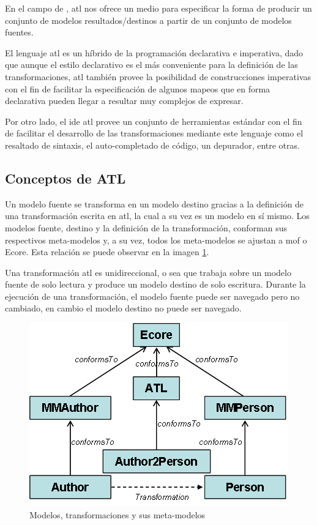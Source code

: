 \documentclass[a4paper,12pt,oneside,spanish]{book}
\begin{document}
En el campo de , \gls{atl} nos ofrece un medio para especificar la forma de producir un conjunto de modelos resultados/destinos a partir de un conjunto de modelos fuentes.

El lenguaje \gls{atl} es un híbrido de la programación declarativa e imperativa, dado que aunque el estilo declarativo es el más conveniente para la definición de las transformaciones, \gls{atl} también provee la posibilidad de construcciones imperativas con el fin de facilitar la especificación de algunos mapeos que en forma declarativa pueden llegar a resultar muy complejos de expresar.

Por otro lado, el \gls{ide} \gls{atl} provee un conjunto de herramientas estándar con el fin de facilitar el desarrollo de las transformaciones mediante este lenguaje como el  resaltado de sintaxis, el auto-completado de código, un depurador, entre otras.



\subsection{Conceptos de ATL}

Un modelo fuente se transforma en un modelo destino gracias a la definición de una transformación escrita en \gls{atl}, la cual a su vez es un modelo en sí mismo. Los modelos fuente, destino y la definición de la transformación, conforman sus respectivos meta-modelos y, a su vez, todos los meta-modelos se ajustan a \gls{mof} o \textsf{Ecore}. Esta relación se puede observar en la imagen \ref{fig:ATL-concepts}.

Una transformación \gls{atl} es unidireccional, o sea que trabaja sobre un modelo fuente de solo lectura y produce un modelo destino de solo escritura. Durante la ejecución de una transformación, el modelo fuente puede ser navegado pero no cambiado, en cambio el modelo destino no puede ser navegado.

\begin{figure}[hbtp]
\centering
\includegraphics[scale=.65]{./img/ATL-concepts}
\caption{Modelos, transformaciones y sus meta-modelos}
\label{fig:ATL-concepts}
\end{figure}
\end{document}
